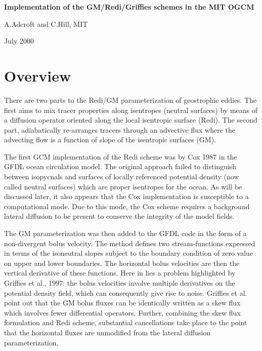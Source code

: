\documentclass[12pt]{article}
\begin{document}

\begin{center} 
{\Large \bf Implementation of the GM/Redi/Griffies schemes in the MIT
OGCM}

\vspace*{4mm}
{\large A.Adcroft and C.Hill, MIT}

\vspace*{3mm}
{\large July 2000}
\end{center}

\section{Overview}

There are two parts to the Redi/GM parameterization of geostrophic
eddies. The first aims to mix tracer properties along isentropes
(neutral surfaces) by means of a diffusion operator oriented along the
local isentropic surface (Redi). The second part, adiabatically
re-arranges tracers through an advective flux where the advecting flow
is a function of slope of the isentropic surfaces (GM).

The first GCM implementation of the Redi scheme was by Cox 1987 in the
GFDL ocean circulation model. The original approach failed to
distinguish between isopycnals and surfaces of locally referenced
potential density (now called neutral surfaces) which are proper
isentropes for the ocean. As will be discussed later, it also appears
that the Cox implementation is susceptible  to a computational mode.
Due to this mode, the Cox scheme requires a background lateral
diffusion to be present to conserve the integrity of the model fields.

The GM parameterization was then added to the GFDL code in the form of
a non-divergent bolus velocity. The method defines two
stream-functions expressed in terms of the isoneutral slopes subject
to the boundary condition of zero value on upper and lower
boundaries. The horizontal bolus velocities are then the vertical
derivative of these functions. Here in lies a problem highlighted by
Griffies et al., 1997: the bolus velocities involve multiple
derivatives on the potential density field, which can consequently
give rise to noise. Griffies et al. point out that the GM bolus fluxes
can be identically written as a skew flux which involves fewer
differential operators. Further, combining the skew flux formulation
and Redi scheme, substantial cancellations take place to the point
that the horizontal fluxes are unmodified from the lateral diffusion
parameterization.
\end{document}
